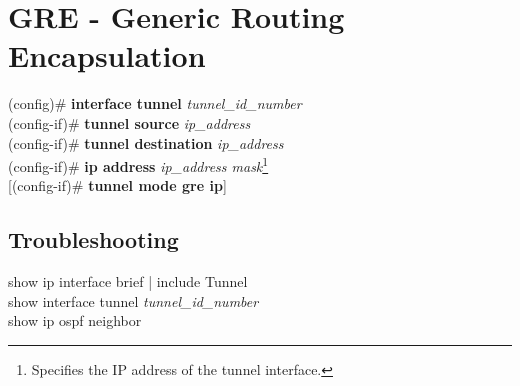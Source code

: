 \section{GRE - Generic Routing Encapsulation}
(config)\# \textbf{interface tunnel} \textit{tunnel\_id\_number}\\
(config-if)\# \textbf{tunnel source} \textit{ip\_address}\\
(config-if)\# \textbf{tunnel destination} \textit{ip\_address}\\
(config-if)\# \textbf{ip address} \textit{ip\_address mask}\footnote{Specifies the IP address of the tunnel interface.}\\
{[}(config-if)\# \textbf{tunnel mode gre ip}]
\subsection{Troubleshooting}
show ip interface brief | include Tunnel\\
show interface tunnel \textit{tunnel\_id\_number}\\
show ip ospf neighbor